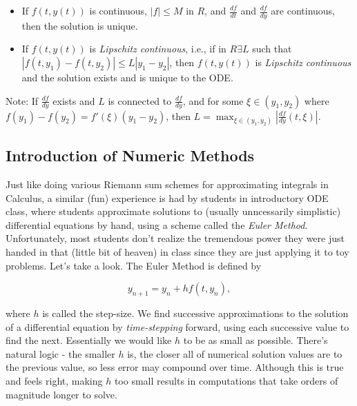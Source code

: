 \documentclass[paper=a4, fontsize=11pt]{scrartcl} %
\numberwithin{equation}{section} %
\numberwithin{figure}{section} %
\numberwithin{table}{section} %
\begin{document}
\begin{itemize}
	\item If $f(t,y(t))$ is continuous, $|f|\leq M$ in $R$, and $\frac{df}{dt}$ and $\frac{df}{dy}$ are continuous, then the solution is unique. 
	\item If $f(t,y(t))$ is \emph{Lipschitz continuous}, i.e., if in $R \exists L$ such that $|f(t,y_1)-f(t,y_2)| \leq L |y_1-y_2|$, then $f(t,y(t))$ is \emph{Lipschitz continuous} and the solution exists and is unique to the ODE.
\end{itemize}

Note: If $\frac{df}{dy}$ exists and $L$ is connected to $\frac{df}{dy}$, and for some $\xi\in (y_1,y_2)$ where $f(y_1)-f(y_2) = f'(\xi) (y_1-y_2)$, then $L = \max_{\xi\in(y_1,y_2)} \left| \frac{df}{dy}(t,\xi) \right|$. \\


\subsection{Introduction of Numeric Methods}

$ $\\

Just like doing various Riemann sum schemes for approximating integrals in Calculus, a similar (fun) experience is had by students in introductory ODE class, where students approximate solutions to (usually unncessarily simplistic) differential equations by hand, using a scheme called the \emph{Euler Method}. \\

Unfortunately, most students don't realize the tremendous power they were just handed in that (little bit of heaven) in class since they are just applying it to toy problems. Let's take a look. The Euler Method is defined by

$$y_{n+1} = y_{n} + h f(t,y_n),$$

where $h$ is called the step-size. We find successive approximations to the solution of a differential equation by \emph{time-stepping} forward, using each successive value to find the next. Essentially we would like $h$ to be as small as possible. There's natural logic - the smaller $h$ is, the closer all of numerical solution values are to the previous value, so less error may compound over time. Although this is true and feels right, making $h$ too small results in computations that take orders of magnitude longer to solve.\\
\end{document}
